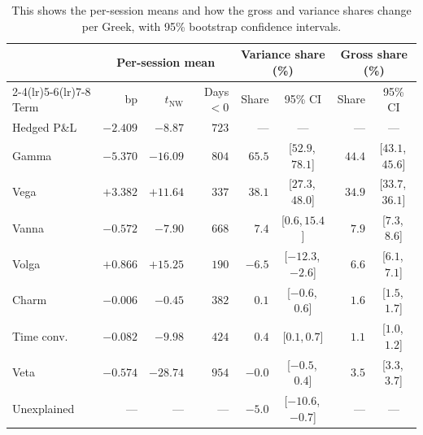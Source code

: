 \documentclass[11pt]{article}
\begin{document}
\begin{table}[tbp]
\centering
\footnotesize
\setlength{\tabcolsep}{4pt}
\begin{tabular}{lrrrrcrc}
\toprule
 & \multicolumn{3}{c}{Per-session mean} & \multicolumn{2}{c}{Variance share (\%)} & \multicolumn{2}{c}{Gross share (\%)} \\
\cmidrule(lr){2-4}\cmidrule(lr){5-6}\cmidrule(lr){7-8}
Term & bp & $t_{\mathrm{NW}}$ & Days $<0$ & Share & 95\% CI & Share & 95\% CI \\
\midrule
Hedged P\&L & $-2.409$ & $-8.87$ & $723$ & --- & --- & --- & --- \\
\midrule
Gamma       & $-5.370$ & $-16.09$ & $804$ & $65.5$ & [$52.9$,\,$78.1$] & $44.4$ & [$43.1$,\,$45.6$] \\
Vega        & $+3.382$ & $+11.64$ & $337$ & $38.1$ & [$27.3$,\,$48.0$] & $34.9$ & [$33.7$,\,$36.1$] \\
Vanna       & $-0.572$ & $-7.90$ & $668$ & $7.4$ & [$0.6$,\,$15.4$] & $7.9$ & [$7.3$,\,$8.6$] \\
Volga       & $+0.866$ & $+15.25$ & $190$ & $-6.5$ & [$-12.3$,\,$-2.6$] & $6.6$ & [$6.1$,\,$7.1$] \\
Charm       & $-0.006$ & $-0.45$ & $382$ & $0.1$ & [$-0.6$,\,$0.6$] & $1.6$ & [$1.5$,\,$1.7$] \\
Time conv.  & $-0.082$ & $-9.98$ & $424$ & $0.4$ & [$0.1$,\,$0.7$] & $1.1$ & [$1.0$,\,$1.2$] \\
Veta        & $-0.574$ & $-28.74$ & $954$ & $-0.0$ & [$-0.5$,\,$0.4$] & $3.5$ & [$3.3$,\,$3.7$] \\
\midrule
Unexplained & --- & --- & --- & $-5.0$ & [$-10.6$,\,$-0.7$] & --- & --- \\
\bottomrule
\end{tabular}
\caption{This shows the per-session means and how the gross and variance shares change per Greek, with 95\% bootstrap confidence intervals.}
\label{tab:drifts}
\end{table}
\end{document}
